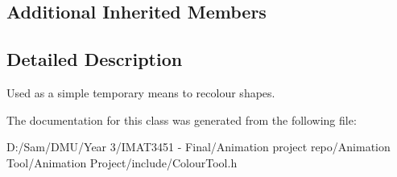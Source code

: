 \subsection*{Additional Inherited Members}


\subsection{Detailed Description}
Used as a simple temporary means to recolour shapes. 

The documentation for this class was generated from the following file\+:\begin{DoxyCompactItemize}
\item 
D\+:/\+Sam/\+D\+M\+U/\+Year 3/\+I\+M\+A\+T3451 -\/ Final/\+Animation project repo/\+Animation Tool/\+Animation Project/include/Colour\+Tool.\+h\end{DoxyCompactItemize}
